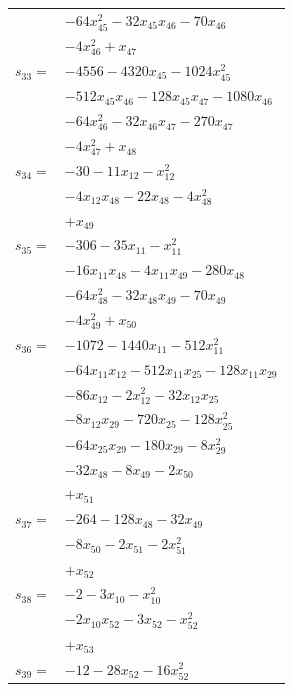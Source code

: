 \begin{longtable}{@{}r@{\;}l@{}}
 & \(\displaystyle -64x_{45}^{2} -32x_{45}x_{46} -70x_{46}\) \\
 & \(\displaystyle -4x_{46}^{2} +x_{47}\) \\[3pt]
\(s_{33}=\) & \(\displaystyle -4556 -4320x_{45} -1024x_{45}^{2}\) \\
 & \(\displaystyle -512x_{45}x_{46} -128x_{45}x_{47} -1080x_{46}\) \\
 & \(\displaystyle -64x_{46}^{2} -32x_{46}x_{47} -270x_{47}\) \\
 & \(\displaystyle -4x_{47}^{2} +x_{48}\) \\[3pt]
\(s_{34}=\) & \(\displaystyle -30 -11x_{12} -x_{12}^{2}\) \\
 & \(\displaystyle -4x_{12}x_{48} -22x_{48} -4x_{48}^{2}\) \\
 & \(\displaystyle +x_{49}\) \\[3pt]
\(s_{35}=\) & \(\displaystyle -306 -35x_{11} -x_{11}^{2}\) \\
 & \(\displaystyle -16x_{11}x_{48} -4x_{11}x_{49} -280x_{48}\) \\
 & \(\displaystyle -64x_{48}^{2} -32x_{48}x_{49} -70x_{49}\) \\
 & \(\displaystyle -4x_{49}^{2} +x_{50}\) \\[3pt]
\(s_{36}=\) & \(\displaystyle -1072 -1440x_{11} -512x_{11}^{2}\) \\
 & \(\displaystyle -64x_{11}x_{12} -512x_{11}x_{25} -128x_{11}x_{29}\) \\
 & \(\displaystyle -86x_{12} -2x_{12}^{2} -32x_{12}x_{25}\) \\
 & \(\displaystyle -8x_{12}x_{29} -720x_{25} -128x_{25}^{2}\) \\
 & \(\displaystyle -64x_{25}x_{29} -180x_{29} -8x_{29}^{2}\) \\
 & \(\displaystyle -32x_{48} -8x_{49} -2x_{50}\) \\
 & \(\displaystyle +x_{51}\) \\[3pt]
\(s_{37}=\) & \(\displaystyle -264 -128x_{48} -32x_{49}\) \\
 & \(\displaystyle -8x_{50} -2x_{51} -2x_{51}^{2}\) \\
 & \(\displaystyle +x_{52}\) \\[3pt]
\(s_{38}=\) & \(\displaystyle -2 -3x_{10} -x_{10}^{2}\) \\
 & \(\displaystyle -2x_{10}x_{52} -3x_{52} -x_{52}^{2}\) \\
 & \(\displaystyle +x_{53}\) \\[3pt]
\(s_{39}=\) & \(\displaystyle -12 -28x_{52} -16x_{52}^{2}\) \\

\end{longtable}
